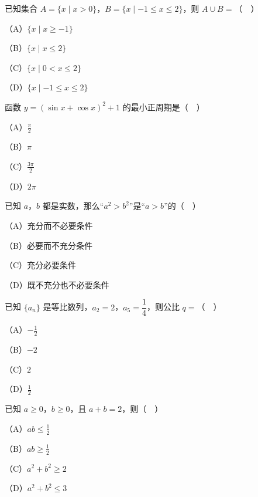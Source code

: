 


\begin{question}
已知集合 $A=\{x\mid x>0\}$，$B=\{x\mid -1\leqslant x\leqslant2\}$，则 $A\cup B=$（　）

（A）$\{x\mid x\geqslant-1\}$

（B）$\{x\mid x\leqslant2\}$

（C）$\{x\mid 0<x\leqslant2\}$

（D）$\{x\mid -1\leqslant x\leqslant2\}$

\end{question}
\begin{question}
函数 $y=(\sin x+\cos x)^2+1$ 的最小正周期是（　）

（A）$\frac{\pi}2$

（B）$\pi$

（C）$\frac{3\pi}2$

（D）$2\pi$

\end{question}
\begin{question}
已知 $a$，$b$ 都是实数，那么“$a^2>b^2$”是“$a>b$”的（　）

（A）充分而不必要条件

（B）必要而不充分条件

（C）充分必要条件

（D）既不充分也不必要条件

\end{question}
\begin{question}
已知 $\{a_n\}$ 是等比数列，$a_2=2$，$a_5=\dfrac14$，则公比 $q=$（　）

（A）$-\frac12$

（B）$-2$

（C）$2$

（D）$\frac12$

\end{question}
\begin{question}
已知 $a\geqslant0$，$b\geqslant0$，且 $a+b=2$，则（　）

（A）$ab\leqslant\frac12$

（B）$ab\geqslant\frac12$

（C）$a^2+b^2\geqslant2$

（D）$a^2+b^2\leqslant3$

\end{question}
